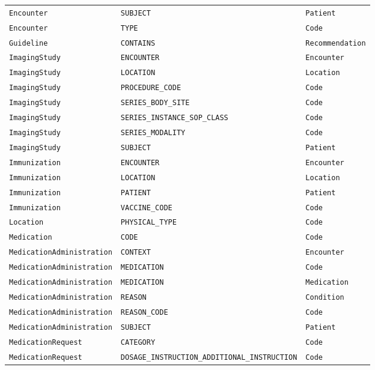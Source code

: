 \begin{longtable}{@{}p{46mm}p{52mm}p{40mm}@{}}
\texttt{Encounter} & \texttt{SUBJECT} & \texttt{Patient} \\
\texttt{Encounter} & \texttt{TYPE} & \texttt{Code} \\
\texttt{Guideline} & \texttt{CONTAINS} & \texttt{Recommendation} \\
\texttt{ImagingStudy} & \texttt{ENCOUNTER} & \texttt{Encounter} \\
\texttt{ImagingStudy} & \texttt{LOCATION} & \texttt{Location} \\
\texttt{ImagingStudy} & \texttt{PROCEDURE\_CODE} & \texttt{Code} \\
\texttt{ImagingStudy} & \texttt{SERIES\_BODY\_SITE} & \texttt{Code} \\
\texttt{ImagingStudy} & \texttt{SERIES\_INSTANCE\_SOP\_CLASS} & \texttt{Code} \\
\texttt{ImagingStudy} & \texttt{SERIES\_MODALITY} & \texttt{Code} \\
\texttt{ImagingStudy} & \texttt{SUBJECT} & \texttt{Patient} \\
\texttt{Immunization} & \texttt{ENCOUNTER} & \texttt{Encounter} \\
\texttt{Immunization} & \texttt{LOCATION} & \texttt{Location} \\
\texttt{Immunization} & \texttt{PATIENT} & \texttt{Patient} \\
\texttt{Immunization} & \texttt{VACCINE\_CODE} & \texttt{Code} \\
\texttt{Location} & \texttt{PHYSICAL\_TYPE} & \texttt{Code} \\
\texttt{Medication} & \texttt{CODE} & \texttt{Code} \\
\texttt{MedicationAdministration} & \texttt{CONTEXT} & \texttt{Encounter} \\
\texttt{MedicationAdministration} & \texttt{MEDICATION} & \texttt{Code} \\
\texttt{MedicationAdministration} & \texttt{MEDICATION} & \texttt{Medication} \\
\texttt{MedicationAdministration} & \texttt{REASON} & \texttt{Condition} \\
\texttt{MedicationAdministration} & \texttt{REASON\_CODE} & \texttt{Code} \\
\texttt{MedicationAdministration} & \texttt{SUBJECT} & \texttt{Patient} \\
\texttt{MedicationRequest} & \texttt{CATEGORY} & \texttt{Code} \\
\texttt{MedicationRequest} & \texttt{DOSAGE\_INSTRUCTION\_ADDITIONAL\_INSTRUCTION} & \texttt{Code} \\

\end{longtable}

